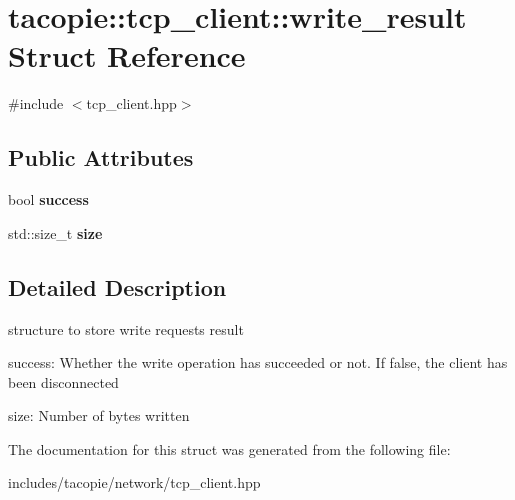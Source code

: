 \hypertarget{structtacopie_1_1tcp__client_1_1write__result}{}\section{tacopie\+:\+:tcp\+\_\+client\+:\+:write\+\_\+result Struct Reference}
\label{structtacopie_1_1tcp__client_1_1write__result}


{\ttfamily \#include $<$tcp\+\_\+client.\+hpp$>$}

\subsection*{Public Attributes}
\begin{DoxyCompactItemize}
\item 
\mbox{\label{structtacopie_1_1tcp__client_1_1write__result_a4a8d5706c83068a97c10e63c6080e6a3}} 
bool {\bfseries success}
\item 
\mbox{\label{structtacopie_1_1tcp__client_1_1write__result_acee9eca954a6f1b6283c6188eead2ab1}} 
std\+::size\+\_\+t {\bfseries size}
\end{DoxyCompactItemize}


\subsection{Detailed Description}
structure to store write requests result
\begin{DoxyItemize}
\item success\+: Whether the write operation has succeeded or not. If false, the client has been disconnected
\item size\+: Number of bytes written 
\end{DoxyItemize}

The documentation for this struct was generated from the following file\+:\begin{DoxyCompactItemize}
\item 
includes/tacopie/network/tcp\+\_\+client.\+hpp\end{DoxyCompactItemize}
